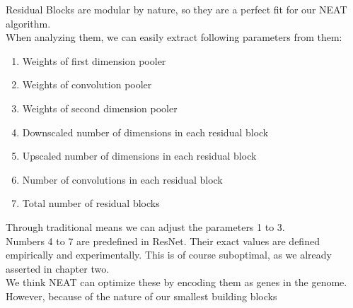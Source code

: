 Residual Blocks are modular by nature, so they are a perfect fit for our NEAT algorithm.\\
When analyzing them, we can easily extract following parameters from them:\\
\begin{enumerate}
	\item{Weights of first dimension pooler}
	\item{Weights of convolution pooler}
	\item{Weights of second dimension pooler}
	\item{Downscaled number of dimensions in each residual block}
	\item{Upscaled number of dimensions in each residual block}
	\item{Number of convolutions in each residual block}
	\item{Total number of residual blocks}
\end{enumerate}  
Through traditional means we can adjust the parameters 1 to 3. \\
Numbers 4 to 7 are predefined in ResNet. 
Their exact values are defined empirically and experimentally. This is of course suboptimal, as we already asserted in chapter two.\\
We think NEAT can optimize these by encoding them as genes in the genome. \\
However, because of the nature of our smallest building blocks